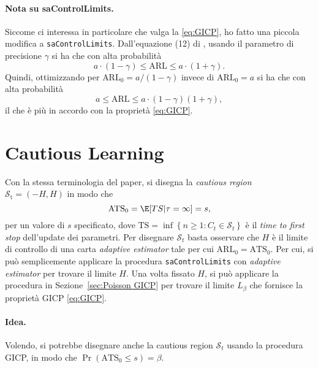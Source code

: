\documentclass{article}
\begin{document}
\paragraph{Nota su saControlLimits.} Siccome ci interessa in particolare che valga la \eqref{eq:GICP}, ho fatto una piccola modifica a \texttt{saControlLimits}.
Dall'equazione (12) di \citep{capizzi2016}, usando il parametro di precisione $ \gamma$ si ha che con alta probabilità
\[
    a\cdot (1-\gamma) \le \text{ARL} \le a\cdot (1+\gamma).
\]
Quindi, ottimizzando per $ \text{ARL}_0 = a /(1-\gamma)$ invece di $ \text{ARL}_0 = a$ si ha che con alta probabilità
\[
    a \le \text{ARL} \le a\cdot (1-\gamma)(1+\gamma),
\]
il che è più in accordo con la proprietà \eqref{eq:GICP}.

\section{Cautious Learning}\label{sec:Cautious Learning}
Con la stessa terminologia del paper, si disegna la \textit{cautious region} $ \mathcal{S}_\text{t} = (-H, H)$ in modo che
\[
    \text{ATS}_0 = \E[TS|\tau = \infty ] = s,
\]
per un valore di $ s$ specificato, dove $ \text{TS} = \inf\left\{ n \ge 1 : C_{t}\in \mathcal{S}_{t} \right\}$ è il \textit{time to first stop} dell'update dei parametri.
Per disegnare $ \mathcal{S}_{t}$ basta osservare che $H$ è il limite di controllo di una carta \textit{adaptive estimator} tale per cui $ \text{ARL}_0 = \text{ATS}_0$.
Per cui, si può semplicemente applicare la procedura \texttt{saControlLimits} con \textit{adaptive estimator} per trovare il limite $ H$.
Una volta fissato $ H$, si può applicare la procedura in Sezione~\ref{sec:Poisson GICP} per trovare il limite $ L_\beta$ che fornisce la proprietà GICP \eqref{eq:GICP}.

\paragraph{Idea.} Volendo, si potrebbe disegnare anche la cautious region $ \mathcal{S}_{t}$ usando la procedura GICP, in modo che $ \Pr(\text{ATS}_0 \le s) = \beta.$


\printbibliography
\end{document}
